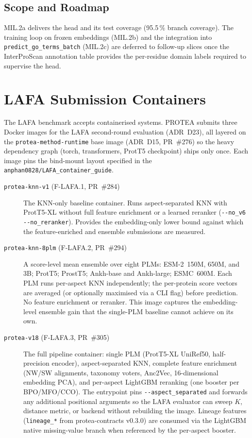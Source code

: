 \subsection{Scope and Roadmap}
\label{subsec:mil-scope}

MIL.2a delivers the head and its test coverage (95.5\,\% branch coverage).
The training loop on frozen embeddings (MIL.2b) and the integration into
\texttt{predict\_go\_terms\_batch} (MIL.2c) are deferred to follow-up
slices once the InterProScan annotation table provides the per-residue
domain labels required to supervise the head.

\section{LAFA Submission Containers}
\label{sec:lafa-containers}

The LAFA benchmark accepts containerised systems. PROTEA submits three Docker
images for the LAFA second-round evaluation (ADR~D23), all layered on the
\texttt{protea-method-runtime} base image (ADR~D15, PR~\#276) so the heavy
dependency graph (torch, transformers, ProtT5 checkpoint) ships only once.
Each image pins the bind-mount layout specified in the
\texttt{anphan0828/LAFA\_container\_guide}.

\begin{description}
  \item[\texttt{protea-knn-v{}1} (F-LAFA.1, PR~\#284)] The KNN-only baseline
    container. Runs aspect-separated KNN with ProtT5-XL without full feature
    enrichment or a learned reranker (\texttt{-{}-no\_v6 -{}-no\_reranker}).
    Provides the embedding-only lower bound against which the feature-enriched
    and ensemble submissions are measured.

  \item[\texttt{protea-knn-8plm} (F-LAFA.2, PR~\#294)] A score-level mean
    ensemble over eight PLMs: ESM-2~150M, 650M, and 3B; ProtT5; ProstT5;
    Ankh-base and Ankh-large; ESMC~600M. Each PLM runs per-aspect KNN
    independently; the per-protein score vectors are averaged (or optionally
    maximised via a CLI flag) before prediction. No feature enrichment or
    reranker. This image captures the embedding-level ensemble gain that the
    single-PLM baseline cannot achieve on its own.

  \item[\texttt{protea-v{}18} (F-LAFA.3, PR~\#305)] The full pipeline
    container: single PLM (ProtT5-XL UniRef50, half-precision encoder),
    aspect-separated KNN, complete feature enrichment (NW/SW alignments,
    taxonomy voters, Anc2Vec, 16-dimensional embedding PCA), and per-aspect
    LightGBM reranking (one booster per BPO/MFO/CCO). The entrypoint pins
    \texttt{-{}-aspect\_separated} and forwards any additional positional
    arguments so the LAFA evaluator can sweep $K$, distance metric, or
    backend without rebuilding the image. Lineage features
    (\texttt{lineage\_*} from protea-contracts v0.3.0) are consumed via the
    LightGBM native missing-value branch when referenced by the per-aspect
    booster.
\end{description}

